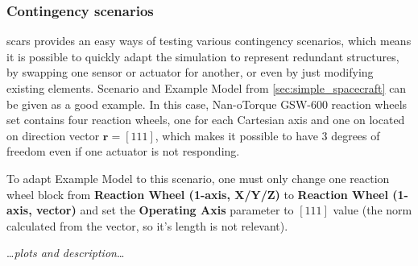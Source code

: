     \subsubsection{Contingency scenarios}
        \ac{scars} provides an easy ways of testing various contingency scenarios, which means it is possible to quickly adapt the simulation to represent redundant structures, by swapping one sensor or actuator for another, or even by just modifying existing elements. Scenario and Example Model from \autoref{sec:simple_spacecraft} can be given as a good example. In this case,  Nan-oTorque GSW-600 reaction wheels set contains four reaction wheels, one for each Cartesian axis and one on located on direction vector $\textbf{r} = [1 1 1]$, which makes it possible to have 3 degrees of freedom even if one actuator is not responding.

        To adapt Example Model to this scenario, one must only change one reaction wheel block from \textbf{Reaction Wheel (1-axis, X/Y/Z)} to \textbf{Reaction Wheel (1-axis, vector)} and set the \textbf{Operating Axis} parameter to $[1 1 1]$ value (the norm calculated from the vector, so it's length is not relevant).

        
        \dots\textit{plots and description}\dots
